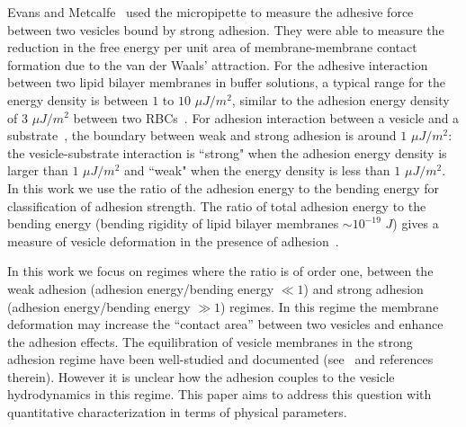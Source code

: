 \documentclass[prf,superscriptaddress,showpacs]{revtex4-1}
\begin{document}
Evans and Metcalfe~\cite{EvansMetcalfe1984_BJ} used the micropipette to
measure the adhesive force between two vesicles bound by strong
adhesion.  They were able to measure the reduction in the free energy
per unit area of membrane-membrane contact formation due to the van der
Waals' attraction. For the adhesive interaction between two lipid
bilayer membranes in buffer solutions, a typical range for the energy
density is between $1$ to $10$ $\mu J/m^2$, similar to the adhesion
energy density of $3$ $\mu J/m^2$ between two
RBCs~\cite{FlormannAouane2017_SciReports}.  For adhesion interaction
between a vesicle and a substrate~\cite{GruhnFrankeDimova2007_Langmuir},
the boundary between weak and strong adhesion is around $1$ $\mu J/m^2$:
the vesicle-substrate interaction is ``strong" when the adhesion energy
density is larger than $1$ $\mu J/m^2$ and ``weak" when the energy
density is less than $1$ $\mu J/m^2$.  In this work we use the ratio of
the adhesion energy to the bending energy for classification of adhesion
strength. The ratio of total adhesion energy to the bending energy
(bending rigidity of lipid bilayer membranes $\sim 10^{-19}$ $J$) gives
a measure of vesicle deformation in the presence of
adhesion~\cite{RamachandranAndersonLealIsraelachvili2010_Langmuir}. 

In this work we focus on regimes where the ratio is of order one,
between the weak adhesion (adhesion energy/bending energy $\ll 1$) and
strong adhesion (adhesion energy/bending energy $\gg 1$) regimes.  In
this regime the membrane deformation may increase the ``contact area''
between two vesicles and enhance the adhesion effects.  The
equilibration of vesicle membranes in the strong adhesion regime have
been well-studied and documented
(see~\cite{RamachandranAndersonLealIsraelachvili2010_Langmuir,
SteinkuhlerAgudo-Canalejo2016_BJ, FlormannAouane2017_SciReports} and
references therein). However it is unclear how the adhesion couples to
the vesicle hydrodynamics in this regime.  This paper aims to address
this question with quantitative characterization in terms of physical
parameters.

%
% 
% 
\end{document}
